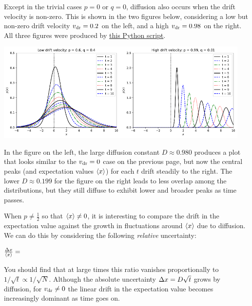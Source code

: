 Except in the trivial cases $p = 0$ or $q = 0$, diffusion also occurs when the drift velocity is non-zero.
This is shown in the two figures below, considering a low but non-zero drift velocity $v_{\mathrm{dr}} = 0.2$ on the left, and a high $v_{\mathrm{dr}} = 0.98$ on the right.
All three figures were produced by \href{https://github.com/daschaich/MATH327_2025/blob/main/lecture_notes/unit01_dist.py}{this Python script}.
\begin{center} %
  \includegraphics[width=0.475\textwidth]{figs/unit01_diff_low.pdf}\hfill \includegraphics[width=0.475\textwidth]{figs/unit01_diff_high.pdf}
\end{center}
In the figure on the left, the large diffusion constant $D \approx 0.980$ produces a plot that looks similar to the $v_{\mathrm{dr}} = 0$ case on the previous page, but now the central peaks (and expectation values $\left\langle x \right\rangle$) for each $t$ drift steadily to the right.
The lower $D \approx 0.199$ for the figure on the right leads to less overlap among the distributions, but they still diffuse to exhibit lower and broader peaks as time passes.

When $p \neq \frac{1}{2}$ so that $\left\langle x \right\rangle \neq 0$, it is interesting to compare the drift in the expectation value against the growth in fluctuations around $\left\langle x \right\rangle$ due to diffusion.
We can do this by considering the following \textit{relative} uncertainty:
\begin{mdframed}
  $\frac{\Delta x}{\left\langle x \right\rangle} = $ \\[100 pt]
\end{mdframed}
You should find that at large times this ratio vanishes proportionally to $1 / \sqrt{t} \propto 1 / \sqrt{N}$.
Although the absolute uncertainty $\Delta x = D \sqrt{t}$ grows by diffusion, for $v_{\mathrm{dr}} \neq 0$ the linear drift in the expectation value becomes increasingly dominant as time goes on.



